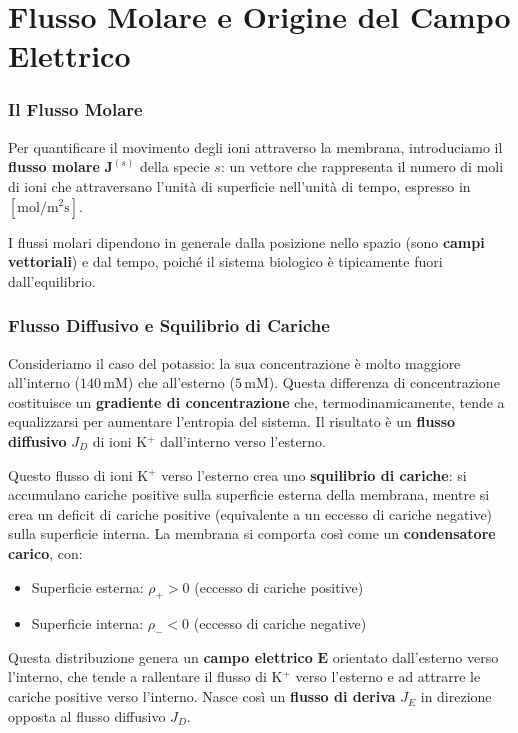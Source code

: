 \section{Flusso Molare e Origine del Campo Elettrico}

\subsubsection{Il Flusso Molare}

Per quantificare il movimento degli ioni attraverso la membrana, introduciamo il \textbf{flusso molare} $\mathbf{J}^{(s)}$ della specie $s$: un vettore che rappresenta il numero di moli di ioni che attraversano l'unità di superficie nell'unità di tempo, espresso in $[\text{mol}/\text{m}^2\text{s}]$.

I flussi molari dipendono in generale dalla posizione nello spazio (sono \textbf{campi vettoriali}) e dal tempo, poiché il sistema biologico è tipicamente fuori dall'equilibrio.

\subsubsection{Flusso Diffusivo e Squilibrio di Cariche}

Consideriamo il caso del potassio: la sua concentrazione è molto maggiore all'interno ($140\,\text{mM}$) che all'esterno ($5\,\text{mM}$). Questa differenza di concentrazione costituisce un \textbf{gradiente di concentrazione} che, termodinamicamente, tende a equalizzarsi per aumentare l'entropia del sistema. Il risultato è un \textbf{flusso diffusivo} $J_D$ di ioni K$^+$ dall'interno verso l'esterno.

Questo flusso di ioni K$^+$ verso l'esterno crea uno \textbf{squilibrio di cariche}: si accumulano cariche positive sulla superficie esterna della membrana, mentre si crea un deficit di cariche positive (equivalente a un eccesso di cariche negative) sulla superficie interna. La membrana si comporta così come un \textbf{condensatore carico}, con:

\begin{itemize}
    \item Superficie esterna: $\rho_+ > 0$ (eccesso di cariche positive)
    \item Superficie interna: $\rho_- < 0$ (eccesso di cariche negative)
\end{itemize}

Questa distribuzione genera un \textbf{campo elettrico} $\mathbf{E}$ orientato dall'esterno verso l'interno, che tende a rallentare il flusso di K$^+$ verso l'esterno e ad attrarre le cariche positive verso l'interno. Nasce così un \textbf{flusso di deriva} $J_E$ in direzione opposta al flusso diffusivo $J_D$.

